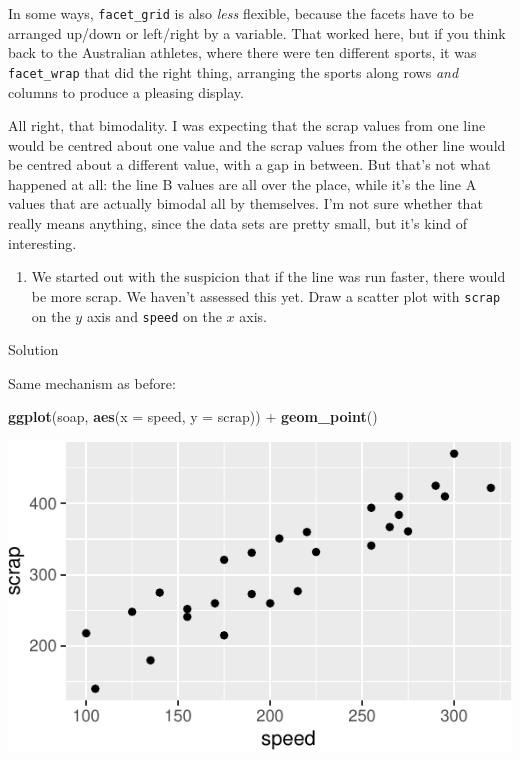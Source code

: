 \documentclass[]{tufte-book}
\newenvironment{Shaded}{}{}
\newcommand{\DataTypeTok}[1]{\textcolor[rgb]{0.56,0.13,0.00}{#1}}
\newcommand{\KeywordTok}[1]{\textcolor[rgb]{0.00,0.44,0.13}{\textbf{#1}}}
\newcommand{\NormalTok}[1]{#1}
\newcommand{\OperatorTok}[1]{\textcolor[rgb]{0.40,0.40,0.40}{#1}}
\newcommand{\StringTok}[1]{\textcolor[rgb]{0.25,0.44,0.63}{#1}}
\providecommand{\tightlist}{%
  \setlength{\itemsep}{0pt}\setlength{\parskip}{0pt}}
\theoremstyle{definition}
\theoremstyle{definition}
\theoremstyle{definition}
\theoremstyle{remark}
\begin{document}
In some ways, \texttt{facet\_grid} is also \emph{less} flexible, because
the facets have to be arranged up/down or left/right by a variable. That
worked here, but if you think back to the Australian athletes, where
there were ten different sports, it was \texttt{facet\_wrap} that did
the right thing, arranging the sports along rows \emph{and} columns to
produce a pleasing display.

All right, that bimodality. I was expecting that the scrap values from
one line would be centred about one value and the scrap values from the
other line would be centred about a different value, with a gap in
between. But that's not what happened at all: the line B values are all
over the place, while it's the line A values that are actually bimodal
all by themselves. I'm not sure whether that really means anything,
since the data sets are pretty small, but it's kind of interesting.

\begin{enumerate}
\def\labelenumi{(\alph{enumi})}
\setcounter{enumi}{5}
\tightlist
\item
  We started out with the suspicion that if the line was run faster,
  there would be more scrap. We haven't assessed this yet. Draw a
  scatter plot with \texttt{scrap} on the \(y\) axis and \texttt{speed}
  on the \(x\) axis.
\end{enumerate}

Solution

Same mechanism as before:

\begin{Shaded}
\begin{Highlighting}[]
\KeywordTok{ggplot}\NormalTok{(soap, }\KeywordTok{aes}\NormalTok{(}\DataTypeTok{x =}\NormalTok{ speed, }\DataTypeTok{y =}\NormalTok{ scrap)) }\OperatorTok{+}\StringTok{ }\KeywordTok{geom_point}\NormalTok{()}
\end{Highlighting}
\end{Shaded}

\includegraphics{02-reading-in_files/figure-latex/unnamed-chunk-16-1}
\end{document}
